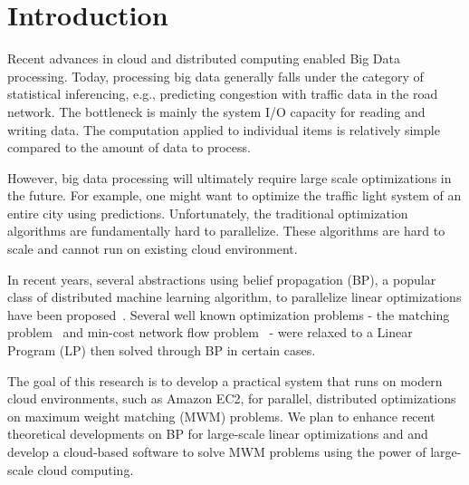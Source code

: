 \section{Introduction}

Recent advances in cloud and distributed computing enabled Big Data 
processing. Today, processing big data generally falls under the category 
of statistical inferencing, e.g., predicting congestion with traffic data 
in the road network. The bottleneck is mainly the system I/O capacity for 
reading and writing data. The computation applied to individual items is 
relatively simple compared to the amount of data to process. 

However, big data processing will ultimately require large scale 
optimizations in the future. For example, one might want to optimize the 
traffic light system of an entire city using predictions. 
Unfortunately, the traditional optimization algorithms are fundamentally hard to parallelize. These algorithms are hard to scale and cannot run on existing cloud environment. 

In recent years, several abstractions using belief propagation (BP), a popular class of distributed machine learning algorithm, to 
parallelize linear optimizations have been proposed~\cite{BPLP, BPLPmatching}. 
Several well known optimization problems - the matching problem~\cite{BPmatching} and min-cost network flow problem~\cite{BPflow} - were relaxed to a Linear Program (LP) then solved through BP in certain cases. 

The goal of this research is to develop a practical system that runs on modern cloud environments, such as Amazon EC2, for parallel, distributed optimizations on maximum weight matching (MWM) problems. 
We plan to enhance recent theoretical developments on BP for large-scale linear optimizations and and develop a cloud-based software to solve MWM problems using the power of large-scale cloud computing.
